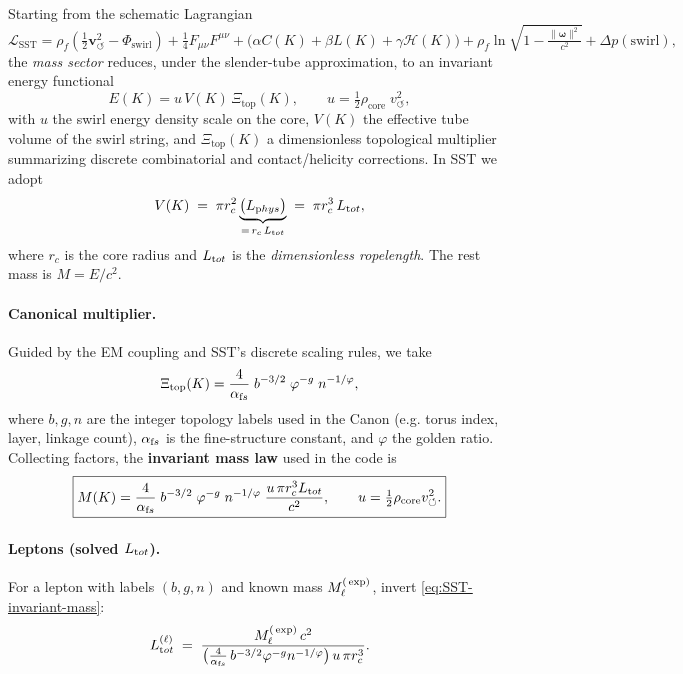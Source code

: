 \documentclass[10pt,reprint,aps,onecolumn,nofootinbib]{revtex4-2}
\newcommand{\vswirl}{\mathbf{v}_{\!\boldsymbol{\circlearrowleft}}}
\newcommand{\rhof}{\rho_{\!f}}                           %
\begin{document}
Starting from the schematic Lagrangian
\[
    \mathcal{L}_{\text{SST}}
    = \rhof\!\left(\tfrac{1}{2}\vswirl^2 - \Phi_{\text{swirl}}\right)
    + \tfrac{1}{4}F_{\mu\nu}F^{\mu\nu}
    + \big(\alpha C(K)+\beta L(K)+\gamma \mathcal{H}(K)\big)
    + \rhof \ln\!\sqrt{1-\tfrac{\|\boldsymbol\omega\|^2}{c^2}}
    + \Delta p(\text{swirl}),
\]
the \emph{mass sector} reduces, under the slender-tube approximation, to an invariant energy functional
\[
    E(K)= u\,V(K)\,\Xi_{\text{top}}(K),\qquad
    u=\tfrac{1}{2}\rho_{\text{core}}\;v_{\circlearrowleft}^{2},
\]
with $u$ the swirl energy density scale on the core, $V(K)$ the effective tube volume of the swirl string, and $\Xi_{\text{top}}(K)$ a dimensionless topological multiplier summarizing discrete combinatorial and contact/helicity corrections. In SST we adopt
\[
    V(K)\;=\;\pi r_c^2 \underbrace{\big(L_{\textrm phys}\big)}_{=\,r_c\,L_{\textrm tot}}
    \;=\;\pi r_c^3\,L_{\textrm tot},
\]
where $r_c$ is the core radius and $L_{\textrm tot}$ is the \emph{dimensionless ropelength}. The rest mass is $M=E/c^2$.

\paragraph{Canonical multiplier.}
    Guided by the EM coupling and SST's discrete scaling rules, we take
    \[
        \Xi_{\text{top}}(K)=\frac{4}{\alpha_{\textrm fs}}\;b^{-3/2}\;\varphi^{-g}\;n^{-1/\varphi},
    \]
    where $b,g,n$ are the integer topology labels used in the Canon (e.g. torus index, layer, linkage count), $\alpha_{\textrm fs}$ is the fine-structure constant, and $\varphi$ the golden ratio. Collecting factors, the \textbf{invariant mass law} used in the code is
    \begin{equation*}
        \boxed{M(K)=\frac{4}{\alpha_{\textrm fs}}\;b^{-3/2}\;\varphi^{-g}\;n^{-1/\varphi}\;
        \frac{u\,\pi r_c^3 L_{\textrm tot}}{c^2},
            \qquad
            u=\tfrac{1}{2}\rho_{\text{core}}v_{\circlearrowleft}^2.
        }\label{eq:SST-invariant-mass}
    \end{equation*}

\paragraph{Leptons (solved $L_{\textrm tot}$).}
    For a lepton with labels $(b,g,n)$ and known mass $M_\ell^{\textrm(\exp)}$, invert \eqref{eq:SST-invariant-mass}:
    \[
        L_{\textrm tot}^{(\ell)} \;=\;
        \frac{M_\ell^{\textrm(\exp)}\,c^2}{\big(\tfrac{4}{\alpha_{\textrm fs}}\,b^{-3/2}\varphi^{-g}n^{-1/\varphi}\big)\,u\,\pi r_c^3}.
    \]
\end{document}

